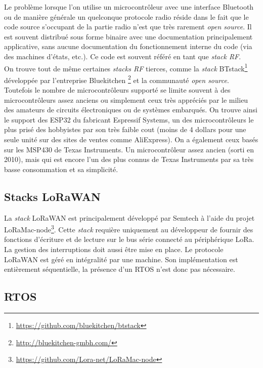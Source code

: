 Le problème lorsque l'on utilise un microcontrôleur avec une interface Bluetooth ou de manière générale un quelconque protocole radio réside dans le fait que le code source s'occupant de la partie radio n'est que très rarement \emph{open source}. Il est souvent distribué sous forme binaire avec une documentation principalement applicative, sans aucune documentation du fonctionnement interne du code (via des machines d'états, etc.). Ce code est souvent référé en tant que \textit{stack RF}.\\

On trouve tout de même certaines \textit{stacks RF} tierces, comme la \textit{stack} BTstack\footnote{\url{https://github.com/bluekitchen/btstack}} développée par l'entreprise Bluekitchen \footnote{\url{http://bluekitchen-gmbh.com/}} et la communauté \textit{open source}. Toutefois le nombre de microcontrôleurs supporté se limite souvent à des microcontrôleurs assez anciens ou simplement ceux très appréciés par le milieu des amateurs de circuits électroniques ou de systèmes embarqués. On trouve ainsi le support des ESP32 du fabricant Espressif Systems, un des microcontrôleurs le plus prisé des hobbyistes par son très faible cout (moins de 4  dollars pour une seule unité sur des sites de ventes comme AliExpress). On a également ceux basés sur les MSP430 de Texas Instruments. Un microcontrôleur assez ancien (sorti en 2010), mais qui est encore l'un des plus connus de Texas Instruments par sa très basse consommation et sa simplicité.

\subsection{Stacks LoRaWAN}

La \textit{stack} LoRaWAN est principalement développé par Semtech à l'aide du projet LoRaMac-node\footnote{\url{https://github.com/Lora-net/LoRaMac-node}}. Cette \textit{stack} requière uniquement au développeur de fournir des fonctions d'écriture et de lecture sur le bus série connecté au périphérique LoRa. La gestion des interruptions doit aussi être mise en place. Le protocole LoRaWAN est géré en intégralité par une machine. Son implémentation est entièrement séquentielle, la présence d'un RTOS n'est donc pas nécessaire.

\subsection{RTOS}
\label{sec-stateoftheart_rtos}

